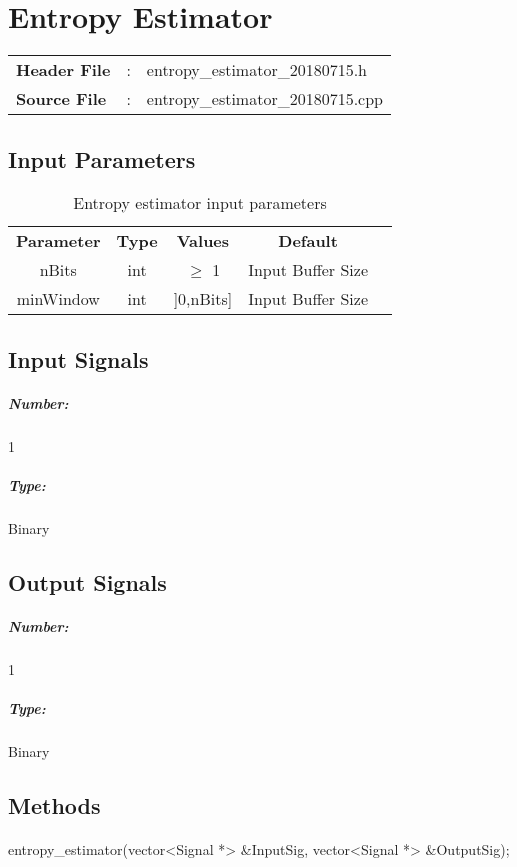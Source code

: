 \clearpage

\section{Entropy Estimator}

\begin{tcolorbox}	
	\begin{tabular}{p{2.75cm} p{0.2cm} p{10.5cm}} 	
		\textbf{Header File}   &:& entropy_estimator_20180715.h \\
		\textbf{Source File}   &:& entropy_estimator_20180715.cpp \\
	\end{tabular}
\end{tcolorbox}


\subsection*{Input Parameters}

\begin{table}[h]
	\centering
	\begin{tabular}{|c|c|c|c|c|}
		\cline{1-4}
		\textbf{Parameter} & \textbf{Type} &\textbf{Values} &   \textbf{Default}& \\ \cline{1-4}
		nBits 	& int 	& $\geq$ 1 & Input Buffer Size \\ \cline{1-4}
		minWindow	 & int 	& ]0,nBits]  & Input Buffer Size \\ \cline{1-4} \cline{1-4}
	\end{tabular}
	\caption{Entropy estimator input parameters}
	\label{table:estimator_in_par}
\end{table}

\subsection*{Input Signals}
\subparagraph*{Number:} 1
\subparagraph*{Type:} Binary

\subsection*{Output Signals}
\subparagraph*{Number:} 1
\subparagraph*{Type:} Binary


\subsection*{Methods}

\paragraph{}
entropy_estimator(vector<Signal *> \&InputSig, vector<Signal *> \&OutputSig);
